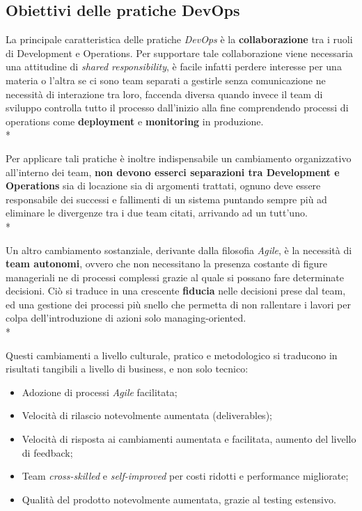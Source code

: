 \documentclass[../main.tex]{subfiles}
\begin{document}
        	\subsection{Obiettivi delle pratiche DevOps}
        	
        		La principale caratteristica delle pratiche \emph{DevOps}\cite{devops_culture} è la \textbf{collaborazione} tra i ruoli di Development e Operations.
        		Per supportare tale collaborazione viene necessaria una attitudine di \emph{shared responsibility}, è facile infatti perdere interesse per una materia o l'altra se ci sono team separati a gestirle senza comunicazione ne necessità di interazione tra loro, faccenda diversa quando invece il team di sviluppo controlla tutto il processo dall'inizio alla fine comprendendo processi di operations come \textbf{deployment} e \textbf{monitoring} in produzione.\\*
        		
        		Per applicare tali pratiche è inoltre indispensabile un cambiamento organizzativo all'interno dei team, \textbf{non devono esserci separazioni tra Development e Operations} sia di locazione sia di argomenti trattati, ognuno deve essere responsabile dei successi e fallimenti di un sistema puntando sempre più ad eliminare le divergenze tra i due team citati, arrivando ad un tutt'uno.\\*
        		
        		Un altro cambiamento sostanziale, derivante dalla filosofia \emph{Agile}, è la necessità di \textbf{team autonomi}, ovvero che non necessitano la presenza costante di figure manageriali ne di processi complessi grazie al quale si possano fare determinate decisioni. Ciò si traduce in una crescente \textbf{fiducia} nelle decisioni prese dal team, ed una gestione dei processi più snello che permetta di non rallentare i lavori per colpa dell'introduzione di azioni solo managing-oriented.\\*
        	
        		Questi cambiamenti a livello culturale, pratico e metodologico si traducono in risultati tangibili a livello di business, e non solo tecnico:
        		\begin{itemize}
        			\item Adozione di processi \emph{Agile} facilitata;
        			\item Velocità di rilascio notevolmente aumentata (deliverables);
        			\item Velocità di risposta ai cambiamenti aumentata e facilitata, aumento del livello di feedback;
        			\item Team \emph{cross-skilled} e \emph{self-improved} per costi ridotti e performance migliorate;
        			\item Qualità del prodotto notevolmente aumentata, grazie al testing estensivo.
        		\end{itemize}
        	
\end{document}
